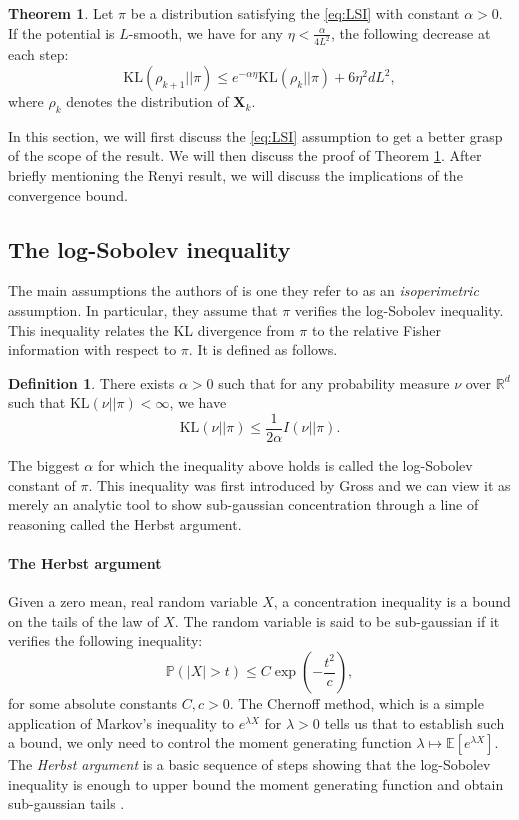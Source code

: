 \documentclass[11pt,twoside]{article}
\theoremstyle{definition}
\newtheorem{definition}{Definition}[section]
\newtheorem{theorem}{Theorem}[section]
\newcommand{\Prb}{\mathbb{P}}
\newcommand{\E}{\mathbb{E}}
\newcommand{\R}{\mathbb{R}}
\newcommand{\bX}{\mathbf{X}}
\newcommand{\KL}{\text{KL}}
\begin{document}
\begin{theorem}
Let $\pi$ be a distribution satisfying the \eqref{eq:LSI} with constant $\alpha > 0$. If the potential is $L$-smooth, we have for any $\eta < \frac{\alpha}{4L^2}$, the following decrease at each step:
\[
\KL(\rho_{k+1} || \pi) \leq e^{-\alpha \eta}\KL(\rho_{k} || \pi) + 6\eta^2 d L^2,
\]
where $\rho_k$ denotes the distribution of $\bX_k$.
\label{thm:step}
\end{theorem}

In this section, we will first discuss the \eqref{eq:LSI} assumption to get a better grasp of the scope of the result. We will then discuss the proof of Theorem \ref{thm:step}. After briefly mentioning the Renyi result, we will discuss the implications of the convergence bound.

\subsection{The log-Sobolev inequality}

The main assumptions the authors of \cite{vempala_rapid_2019} is one they refer to as an \textit{isoperimetric} assumption. In particular, they assume that $\pi$ verifies the log-Sobolev inequality. This inequality relates the KL divergence from $\pi$ to the relative Fisher information with respect to $\pi$. It is defined as follows.

\begin{definition}
  There exists $\alpha >0$ such that for any probability measure $\nu$ over $\R^d$ such that $\KL(\nu || \pi) < \infty$, we have
  \begin{equation}
  \KL(\nu || \pi) \leq \frac{1}{2\alpha} I(\nu || \pi).
  \label{eq:LSI}
  \tag{LSI}
  \end{equation}
\end{definition}

The biggest $\alpha$ for which the inequality above holds is called the log-Sobolev constant of $\pi$. This inequality was first introduced by Gross \cite{gross_logarithmic_1975} and we can view it as merely an analytic tool to show sub-gaussian concentration through a line of reasoning called the Herbst argument. 

\begin{boxK}
\paragraph{The Herbst argument} Given a zero mean, real random variable $X$, a concentration inequality is a bound on the tails of the law of $X$. The random variable is said to be sub-gaussian if it verifies the following inequality:
\[
\Prb(|X| > t) \leq C\exp(-\frac{t^2}{c}),
\]
for some absolute constants $C, c > 0$. The Chernoff method, which is a simple application of Markov's inequality to $e^{\lambda X}$ for $\lambda >0$ tells us that to establish such a bound, we only need to control the moment generating function $\lambda \mapsto \E[e^{\lambda X}]$. The \textit{Herbst argument} is a basic sequence of steps showing that the log-Sobolev inequality is enough to upper bound the moment generating function and obtain sub-gaussian tails \cite{boucheron_concentration_2013, ane_sur_2000}.
\end{boxK} 
\end{document}
